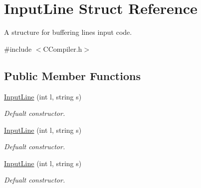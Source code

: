 \hypertarget{structInputLine}{\section{Input\-Line Struct Reference}
\label{structInputLine}
}


A structure for buffering lines input code.  




{\ttfamily \#include $<$C\-Compiler.\-h$>$}

\subsection*{Public Member Functions}
\begin{DoxyCompactItemize}
\item 
\hypertarget{structInputLine_a6a57eafd6e53ea99651327e174c52077}{\hyperlink{structInputLine_a6a57eafd6e53ea99651327e174c52077}{Input\-Line} (int l, string s)}\label{structInputLine_a6a57eafd6e53ea99651327e174c52077}

\begin{DoxyCompactList}\small\item\em Defualt constructor. \end{DoxyCompactList}\item 
\hypertarget{structInputLine_a6a57eafd6e53ea99651327e174c52077}{\hyperlink{structInputLine_a6a57eafd6e53ea99651327e174c52077}{Input\-Line} (int l, string s)}\label{structInputLine_a6a57eafd6e53ea99651327e174c52077}

\begin{DoxyCompactList}\small\item\em Defualt constructor. \end{DoxyCompactList}\item 
\hypertarget{structInputLine_a6a57eafd6e53ea99651327e174c52077}{\hyperlink{structInputLine_a6a57eafd6e53ea99651327e174c52077}{Input\-Line} (int l, string s)}\label{structInputLine_a6a57eafd6e53ea99651327e174c52077}

\begin{DoxyCompactList}\small\item\em Defualt constructor. \end{DoxyCompactList}\end{DoxyCompactItemize}
